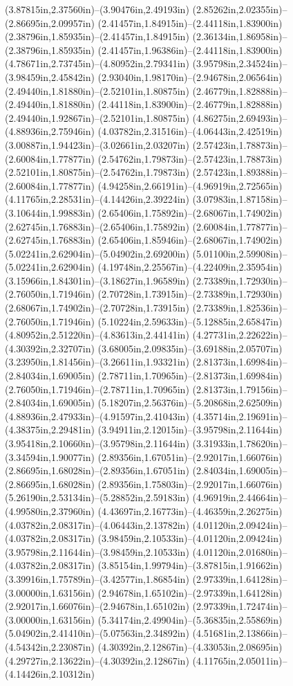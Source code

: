 (3.87815in,2.37560in)--(3.90476in,2.49193in) (2.85262in,2.02355in)--(2.86695in,2.09957in) (2.41457in,1.84915in)--(2.44118in,1.83900in) (2.38796in,1.85935in)--(2.41457in,1.84915in) (2.36134in,1.86958in)--(2.38796in,1.85935in) (2.41457in,1.96386in)--(2.44118in,1.83900in) (4.78671in,2.73745in)--(4.80952in,2.79341in) (3.95798in,2.34524in)--(3.98459in,2.45842in) (2.93040in,1.98170in)--(2.94678in,2.06564in) (2.49440in,1.81880in)--(2.52101in,1.80875in) (2.46779in,1.82888in)--(2.49440in,1.81880in) (2.44118in,1.83900in)--(2.46779in,1.82888in) (2.49440in,1.92867in)--(2.52101in,1.80875in) (4.86275in,2.69493in)--(4.88936in,2.75946in) (4.03782in,2.31516in)--(4.06443in,2.42519in) (3.00887in,1.94423in)--(3.02661in,2.03207in) (2.57423in,1.78873in)--(2.60084in,1.77877in) (2.54762in,1.79873in)--(2.57423in,1.78873in) (2.52101in,1.80875in)--(2.54762in,1.79873in) (2.57423in,1.89388in)--(2.60084in,1.77877in) (4.94258in,2.66191in)--(4.96919in,2.72565in) (4.11765in,2.28531in)--(4.14426in,2.39224in) (3.07983in,1.87158in)--(3.10644in,1.99883in) (2.65406in,1.75892in)--(2.68067in,1.74902in) (2.62745in,1.76883in)--(2.65406in,1.75892in) (2.60084in,1.77877in)--(2.62745in,1.76883in) (2.65406in,1.85946in)--(2.68067in,1.74902in) (5.02241in,2.62904in)--(5.04902in,2.69200in) (5.01100in,2.59908in)--(5.02241in,2.62904in) (4.19748in,2.25567in)--(4.22409in,2.35954in) (3.15966in,1.84301in)--(3.18627in,1.96589in) (2.73389in,1.72930in)--(2.76050in,1.71946in) (2.70728in,1.73915in)--(2.73389in,1.72930in) (2.68067in,1.74902in)--(2.70728in,1.73915in) (2.73389in,1.82536in)--(2.76050in,1.71946in) (5.10224in,2.59633in)--(5.12885in,2.65847in) (4.80952in,2.51220in)--(4.83613in,2.44141in) (4.27731in,2.22622in)--(4.30392in,2.32707in) (3.68005in,2.09835in)--(3.69188in,2.05707in) (3.23950in,1.81456in)--(3.26611in,1.93321in) (2.81373in,1.69984in)--(2.84034in,1.69005in) (2.78711in,1.70965in)--(2.81373in,1.69984in) (2.76050in,1.71946in)--(2.78711in,1.70965in) (2.81373in,1.79156in)--(2.84034in,1.69005in) (5.18207in,2.56376in)--(5.20868in,2.62509in) (4.88936in,2.47933in)--(4.91597in,2.41043in) (4.35714in,2.19691in)--(4.38375in,2.29481in) (3.94911in,2.12015in)--(3.95798in,2.11644in) (3.95418in,2.10660in)--(3.95798in,2.11644in) (3.31933in,1.78620in)--(3.34594in,1.90077in) (2.89356in,1.67051in)--(2.92017in,1.66076in) (2.86695in,1.68028in)--(2.89356in,1.67051in) (2.84034in,1.69005in)--(2.86695in,1.68028in) (2.89356in,1.75803in)--(2.92017in,1.66076in) (5.26190in,2.53134in)--(5.28852in,2.59183in) (4.96919in,2.44664in)--(4.99580in,2.37960in) (4.43697in,2.16773in)--(4.46359in,2.26275in) (4.03782in,2.08317in)--(4.06443in,2.13782in) (4.01120in,2.09424in)--(4.03782in,2.08317in) (3.98459in,2.10533in)--(4.01120in,2.09424in) (3.95798in,2.11644in)--(3.98459in,2.10533in) (4.01120in,2.01680in)--(4.03782in,2.08317in) (3.85154in,1.99794in)--(3.87815in,1.91662in) (3.39916in,1.75789in)--(3.42577in,1.86854in) (2.97339in,1.64128in)--(3.00000in,1.63156in) (2.94678in,1.65102in)--(2.97339in,1.64128in) (2.92017in,1.66076in)--(2.94678in,1.65102in) (2.97339in,1.72474in)--(3.00000in,1.63156in) (5.34174in,2.49904in)--(5.36835in,2.55869in) (5.04902in,2.41410in)--(5.07563in,2.34892in) (4.51681in,2.13866in)--(4.54342in,2.23087in) (4.30392in,2.12867in)--(4.33053in,2.08695in) (4.29727in,2.13622in)--(4.30392in,2.12867in) (4.11765in,2.05011in)--(4.14426in,2.10312in) 